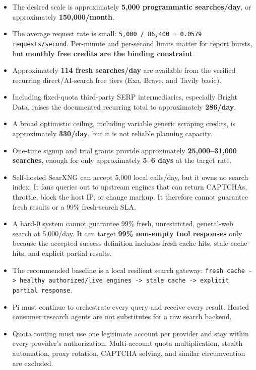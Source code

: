 \documentclass[11pt]{article}
\begin{document}
\begin{itemize}
\item The desired scale is approximately \textbf{5,000 programmatic searches/day}, or
approximately \textbf{150,000/month}.
\item The average request rate is small: \texttt{5,000 / 86,400 = 0.0579 requests/second}.
Per-minute and per-second limits matter for report bursts, but \textbf{monthly free
credits are the binding constraint}.
\item Approximately \textbf{114 fresh searches/day} are available from the verified
recurring direct/AI-search free tiers (Exa, Brave, and Tavily basic).
\item Including fixed-quota third-party SERP intermediaries, especially Bright
Data, raises the documented recurring total to approximately \textbf{286/day}.
\item A broad optimistic ceiling, including variable generic scraping credits, is
approximately \textbf{330/day}, but it is not reliable planning capacity.
\item One-time signup and trial grants provide approximately \textbf{25,000--31,000
searches}, enough for only approximately \textbf{5--6 days} at the target rate.
\item Self-hosted SearXNG can accept 5,000 local calls/day, but it owns no search
index.  It fans queries out to upstream engines that can return CAPTCHAs,
throttle, block the host IP, or change markup.  It therefore cannot guarantee
fresh results or a 99\% fresh-search SLA.
\item A hard-0 system cannot guarantee 99\% fresh, unrestricted, general-web search
at 5,000/day.  It can target \textbf{99\% non-empty tool responses} only because the
accepted success definition includes fresh cache hits, stale cache hits, and
explicit partial results.
\item The recommended baseline is a local resilient search gateway:
\texttt{fresh cache -> healthy authorized/live engines -> stale cache -> explicit
  partial response}.
\item Pi must continue to orchestrate every query and receive every result.  Hosted
consumer research agents are not substitutes for a raw search backend.
\item Quota routing must use one legitimate account per provider and stay within
every provider's authorization.  Multi-account quota multiplication, stealth
automation, proxy rotation, CAPTCHA solving, and similar circumvention are
excluded.
\end{itemize}
\end{document}
